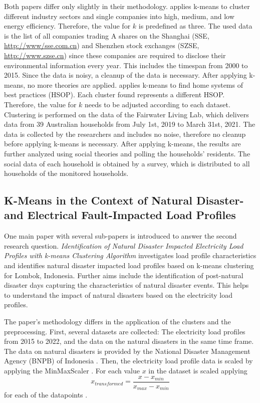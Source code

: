 Both papers differ only slightly in their methodology.
\cite{LIU-BDE} applies k-means to cluster different industry sectors and single companies into high, medium, and low energy efficiency.
Therefore, the value for $k$ is predefined as three.
The used data is the list of all companies trading A shares on the Shanghai (SSE, \url{http://www/sse.com.cn}) and Shenzhen stock exchanges (SZSE, \url{http://www.szse.cn}) since these companies are required to disclose their environmental information every year.
This includes the timespan from 2000 to 2015.
Since the data is noisy, a cleanup of the data is necessary.
After applying k-means, no more theories are applied.
\cite{MAL-HBP} applies k-means to find home systems of best practices (HSOP).
Each cluster found represents a different HSOP.
Therefore, the value for $k$ needs to be adjusted according to each dataset.
Clustering is performed on the data of the Fairwater Living Lab, which delivers data from 39 Australian households from July 1st, 2019 to March 31st, 2021. 
The data is collected by the researchers and includes no noise, therefore no cleanup before applying k-means is necessary.
After applying k-means, the results are further analyzed using social theories and polling the households' residents.
The social data of each household is obtained by a survey, which is distributed to all households of the monitored households.


\subsection{K-Means in the Context of Natural Disaster- and Electrical Fault-Impacted Load Profiles}
One main paper with several sub-papers is introduced to answer the second research question.
\textit{Identification of Natural Disaster Impacted Electricity Load Profiles with k-means Clustering Algorithm} \cite{JES-IND} investigates load profile characteristics and identifies natural disaster impacted load profiles based on k-means clustering for Lombok, Indonesia.
Further aims include the identification of post-natural disaster days capturing the characteristics of natural disaster events.
This helps to understand the impact of natural disasters based on the electricity load profiles.

The paper's methodology differs in the application of the clusters and the preprocessing.
First, several datasets are collected: The electricity load profiles from 2015 to 2022, and the data on the natural disasters in the same time frame.
The data on natural disasters is provided by the National Disaster Management Agency (BNPB) of Indonesia \cite{BNP-CAD}.
Then, the electricity load profile data is scaled by applying the MinMaxScaler \cite{SKL-MMS}.
For each value $x$ in the dataset is scaled applying \begin{equation}\label{eq:minmaxscaler} 
      x_{transformed} = \frac{x - x_{min}}{x_{max} - x_{min}}
\end{equation} for each of the datapoints \cite{JOJ-ENP}.

